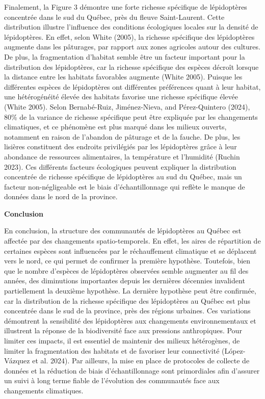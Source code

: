 \documentclass[9pt,twocolumn,twoside,]{pnas-new}
\begin{document}
Finalement, la Figure 3 démontre une forte richesse spécifique de
lépidoptères concentrée dans le sud du Québec, près du fleuve
Saint-Laurent. Cette distribution illustre l'influence des conditions
écologiques locales sur la densité de lépidoptères. En effet, selon
White (2005), la richesse spécifique des lépidoptères augmente dans les
pâturages, par rapport aux zones agricoles autour des cultures. De plus,
la fragmentation d'habitat semble être un facteur important pour la
distribution des lépidoptères, car la richesse spécifique des espèces
décroît lorsque la distance entre les habitats favorables augmente
(White 2005). Puisque les différentes espèces de lépidoptères ont
différentes préférences quant à leur habitat, une hétérogénéité élevée
des habitats favorise une richesse spécifique élevée (White 2005). Selon
Bernabé-Ruiz, Jiménez-Nieva, and Pérez-Quintero (2024), 80\% de la
variance de richesse spécifique peut être expliquée par les changements
climatiques, et ce phénomène est plus marqué dans les milieux ouverts,
notamment en raison de l'abandon de pâturage et de la fauche. De plus,
les lisières constituent des endroits privilégiés par les lépidoptères
grâce à leur abondance de ressources alimentaires, la température et
l'humidité (Ruchin 2023). Ces différents facteurs écologiques peuvent
expliquer la distribution concentrée de richesse spécifique de
lépidoptères au sud du Québec, mais un facteur non-négligeable est le
biais d'échantillonnage qui reflète le manque de données dans le nord de
la province.

\textbf{Conclusion}

En conclusion, la structure des communautés de lépidoptères au Québec
est affectée par des changements spatio-temporels. En effet, les aires
de répartition de certaines espèces sont influencées par le
réchauffement climatique et se déplacent vers le nord, ce qui permet de
confirmer la première hypothèse. Toutefois, bien que le nombre d'espèces
de lépidoptères observées semble augmenter au fil des années, des
diminutions importantes depuis les dernières décennies invalident
partiellement la deuxième hypothèse. La dernière hypothèse peut être
confirmée, car la distribution de la richesse spécifique des
lépidoptères au Québec est plus concentrée dans le sud de la province,
près des régions urbaines. Ces variations démontrent la sensibilité des
lépidoptères aux changements environnementaux et illustrent la réponse
de la biodiversité face aux pressions anthropiques. Pour limiter ces
impacts, il est essentiel de maintenir des milieux hétérogènes, de
limiter la fragmentation des habitats et de favoriser leur connectivité
(López-Vázquez et al. 2024). Par ailleurs, la mise en place de
protocoles de collecte de données et la réduction de biais
d'échantillonnage sont primordiales afin d'assurer un suivi à long terme
fiable de l'évolution des communautés face aux changements climatiques.
\end{document}
